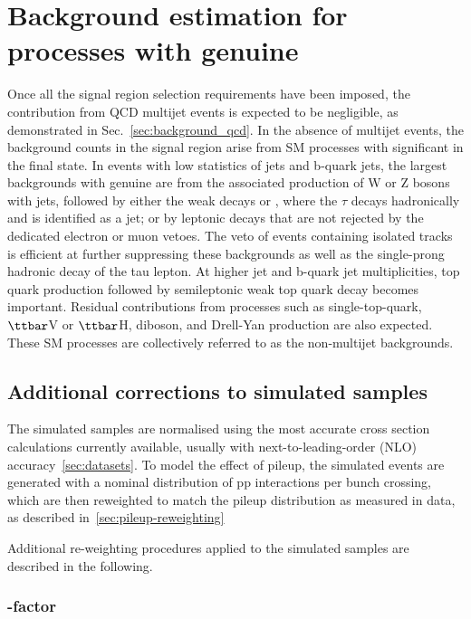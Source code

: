 
\section{Background estimation for processes with genuine \met}
\label{sec:backgroundmet}

Once all the signal region selection requirements have been imposed,
the contribution from QCD multijet events is expected to be
negligible, as demonstrated in Sec.~\ref{sec:background_qcd}. 
In the absence of multijet events, the background counts in the signal region arise from
SM processes with significant \met in the final state. In events with
low statistics of jets and b-quark jets, the largest backgrounds with
genuine \met are from the associated production of W or Z bosons with
jets, followed by either the weak decays \znunu or \wtaunu, where the
$\tau$ decays hadronically and is identified as a jet; or by leptonic
decays that are not rejected by the dedicated electron or muon
vetoes. The veto of events containing isolated tracks is efficient at
further suppressing these backgrounds as well as the single-prong
hadronic decay of the tau lepton. At higher jet and b-quark jet
multiplicities, top quark production followed by semileptonic weak top
quark decay becomes important.  Residual contributions from processes
such as single-top-quark, $\ttbar$V or $\ttbar$H, diboson, and
Drell-Yan production are also expected. These SM processes are
collectively referred to as the non-multijet backgrounds.

\subsection{Additional corrections to simulated samples}
\label{sec:mc-corrections}

The simulated samples are normalised using the most accurate cross
section calculations currently available, usually with
next-to-leading-order (NLO) accuracy~\ref{sec:datasets}. 
To model the effect of pileup, the simulated events are generated with a nominal distribution
of pp interactions per bunch crossing, which are then reweighted
to match the pileup distribution as measured in data, as described in~\ref{sec:pileup-reweighting}

Additional re-weighting procedures applied to the simulated samples are described in the following.

\subsubsection{\texorpdfstring{\gj} k-factor}
\label{sec:gj-kfactor}



